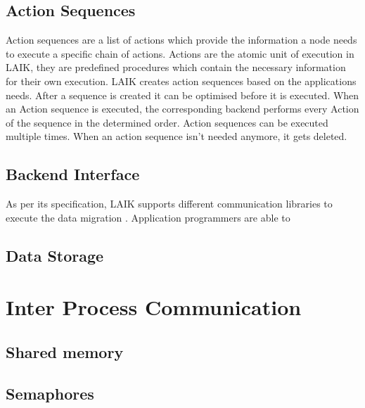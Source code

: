 \subsection{Action Sequences}

Action sequences are a list of actions which provide the information a node needs to execute a specific chain of actions. Actions are the atomic unit of execution in LAIK, they are predefined procedures which contain the necessary information for their own execution. LAIK creates action sequences based on the applications needs. After a sequence is created it can be optimised before it is executed. When an Action sequence is executed, the corresponding backend performs every Action of the sequence in the determined order. Action sequences can be executed multiple times. When an action sequence isn't needed anymore, it gets deleted.

\subsection{Backend Interface}

As per its specification, LAIK supports different communication libraries to execute the data migration \cite{laik-paper}. Application programmers are able to




\subsection{Data Storage}




\section{Inter Process Communication}



\subsection{Shared memory}



\subsection{Semaphores}


